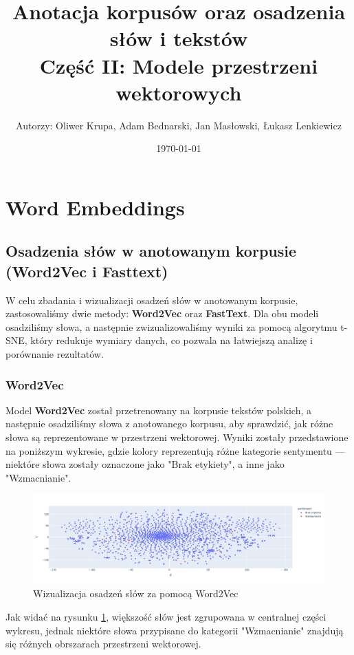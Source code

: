 \documentclass[12pt]{article}
\title{Anotacja korpusów oraz osadzenia słów i tekstów\\Część II: Modele przestrzeni wektorowych}
\author{Autorzy: Oliwer Krupa, Adam Bednarski, Jan Masłowski, Łukasz Lenkiewicz}
\date{\today}
\begin{document}
\maketitle
\newpage

\tableofcontents
\newpage

\section{Word Embeddings}

\subsection{Osadzenia słów w anotowanym korpusie (Word2Vec i Fasttext)}

W celu zbadania i wizualizacji osadzeń słów w anotowanym korpusie, zastosowaliśmy dwie metody: \textbf{Word2Vec} oraz \textbf{FastText}. Dla obu modeli osadziliśmy słowa, a następnie zwizualizowaliśmy wyniki za pomocą algorytmu t-SNE, który redukuje wymiary danych, co pozwala na łatwiejszą analizę i porównanie rezultatów.

\subsubsection{Word2Vec}
Model \textbf{Word2Vec} został przetrenowany na korpusie tekstów polskich, a następnie osadziliśmy słowa z anotowanego korpusu, aby sprawdzić, jak różne słowa są reprezentowane w przestrzeni wektorowej. Wyniki zostały przedstawione na poniższym wykresie, gdzie kolory reprezentują różne kategorie sentymentu — niektóre słowa zostały oznaczone jako "Brak etykiety", a inne jako "Wzmacnianie".

\begin{figure}[H]
    \centering
    \includegraphics[width=\textwidth]{../../plots/w2v-word.png}
    \caption{Wizualizacja osadzeń słów za pomocą Word2Vec}
    \label{fig:w2v_word}
\end{figure}

Jak widać na rysunku \ref{fig:w2v_word}, większość słów jest zgrupowana w centralnej części wykresu, jednak niektóre słowa przypisane do kategorii "Wzmacnianie" znajdują się różnych obrszarach przestrzeni wektorowej.
\end{document}

